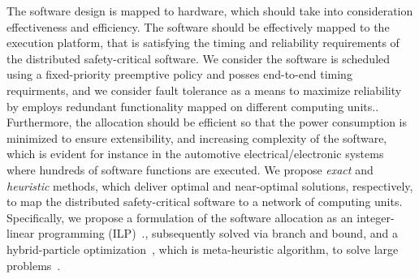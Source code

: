 The software design is mapped to hardware, which should take into consideration effectiveness and efficiency. The software should be effectively mapped to the execution platform, that is satisfying the timing and reliability requirements of the distributed safety-critical software. We consider the software is scheduled using a fixed-priority preemptive policy and posses end-to-end timing requirments, and we consider fault tolerance as a means to maximize reliability by employs redundant functionality mapped on different computing units.. Furthermore, the allocation should be efficient so that the power consumption is minimized to ensure extensibility, and increasing complexity of the software, which is evident for instance in the automotive electrical/electronic systems where hundreds of software functions are executed. We propose  \textit{exact} and \textit{heuristic} methods, which deliver optimal and near-optimal solutions, respectively, to map the distributed safety-critical software to a network of computing units. Specifically, we propose a formulation of the software allocation as an integer-linear programming (ILP)~\cite{Mahmud5222}., subsequently solved via branch and bound, and a hybrid-particle optimization~\cite{Mirjalili2019ParticleOptimisation}, which is meta-heuristic algorithm, to solve large problems~\cite{Mahmud5222-metaheuristic}.

